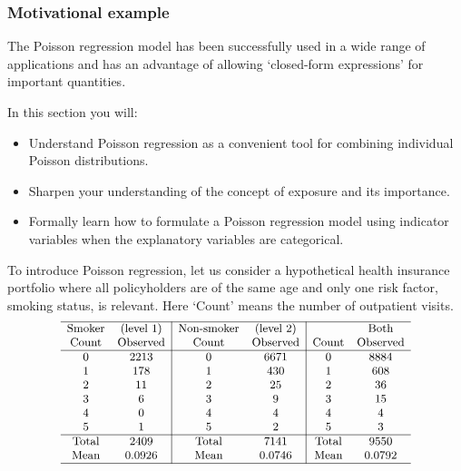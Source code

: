 \documentclass[ignorenonframetext,]{beamer}
\begin{document}
\begin{frame}[allowframebreaks]
\frametitle{Motivational example}

The Poisson regression model has been successfully used in a wide range of applications and has an advantage of allowing `closed-form expressions' for important quantities. 

\vspace{4pt}

In this section you will:  
\begin{itemize}
\item Understand Poisson regression as a convenient tool for combining individual Poisson distributions.
\item Sharpen your understanding of the concept of exposure and its importance.  
\item Formally learn how to formulate a Poisson regression model using indicator variables when the explanatory variables are categorical.
\end{itemize}

\framebreak

To introduce Poisson regression, let us consider a hypothetical health insurance portfolio where all policyholders are of the same age and only one risk factor, smoking status, is relevant. Here `Count' means the number of outpatient visits.
$$
{\small
\begin{matrix}
\begin{array}{cc|cc|cc}
\hline
\text{Smoker} & \text{(level 1)}  & \text{Non-smoker}&\text{(level 2)}  & & \text{Both}\\
  \text{Count} & \text{Observed} &  \text{Count} & \text{Observed}  &   \text{Count} & \text{Observed} \\ \hline
0 & 2213 &   0 & 6671 &  0 & 8884 \\
1 & 178  &   1 & 430  &  1 & 608 \\
2 & 11   &   2 & 25   &  2 & 36 \\
3 & 6    &   3 & 9    &  3 & 15 \\
4 & 0    &   4 & 4    &  4 & 4 \\
5 & 1    &   5 & 2    &  5 & 3 \\ \hline
\text{Total} & 2409  &   \text{Total} & 7141 & \text{Total} & 9550 \\
\text{Mean} & 0.0926 &   \text{Mean} & 0.0746 & \text{Mean} & 0.0792 \\
\hline
    \end{array}
\end{matrix}
}
$$


\end{frame}
\end{document}
